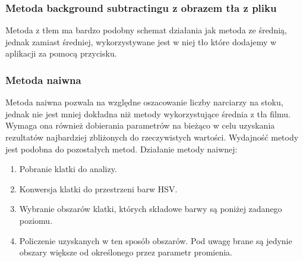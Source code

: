 \documentclass[a4paper]{article}
\begin{document}
\subsubsection{Metoda background subtractingu z obrazem tła z pliku}
Metoda z tłem ma bardzo podobny schemat działania jak metoda ze średnią, jednak zamiast średniej, wykorzystywane jest w niej tło które dodajemy w aplikacji za pomocą przycisku.

\subsubsection{Metoda naiwna}
Metoda naiwna pozwala na względne oszacowanie liczby narciarzy na stoku, jednak nie jest mniej dokładna niż metody wykorzystujące średnia z tła filmu. Wymaga ona również dobierania parametrów na bieżąco w celu uzyskania rezultatów najbardziej zbliżonych do rzeczywistych wartości. Wydajność metody jest podobna do pozostałych metod. Działanie metody naiwnej:
\begin{enumerate}
\item Pobranie klatki do analizy.
\item Konwersja klatki do przestrzeni barw HSV.
\item Wybranie obszarów klatki, których składowe barwy są poniżej zadanego poziomu.
\item Policzenie uzyskanych w ten sposób obszarów. Pod uwagę brane są jedynie obszary większe od określonego przez parametr promienia.
\end{enumerate}
\end{document}
